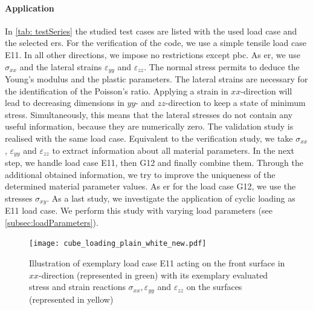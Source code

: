 \paragraph{Application}
In \autoref{tab: testSeries} the studied test cases are listed with the used load case and the selected \acrlong{er}s.
For the verification of the code, we use a simple tensile load case E11.
In all other directions, we impose no restrictions except \acrshort{pbc}. As \acrlong{er}, we use $\sigma_{xx}$ and the lateral strains $\varepsilon_{yy}$ and $\varepsilon_{zz}$. The normal stress permits to deduce the Young's modulus and the plastic parameters. The lateral strains are necessary for the identification of the Poisson's ratio. Applying a strain in $xx$-direction will lead to decreasing dimensions in $yy$- and $zz$-direction to keep a state of minimum stress. Simultaneously, this means that the lateral stresses do not contain any useful information, because they are numerically zero. 
The validation study is realised with the same load case. Equivalent to the verification study, we take $\sigma_{xx}$,  $\varepsilon_{yy}$ and $\varepsilon_{zz}$ to extract information about all material parameters. 
In the next step, we handle load case E11, then G12 and finally combine them. Through the additional obtained information, we try to improve the uniqueness of the determined material parameter values. As \acrlong{er} for the load case G12, we use the stresses $\sigma_{xy}$.
As a last study, we investigate the application of cyclic loading as E11 load case. We perform this study with varying load parameters (see \autoref{subsec:loadParameters}). 


\begin{figure}[H]
    \centering
    \texttt{[image: cube\_loading\_plain\_white\_new.pdf]}
    \caption{Illustration of exemplary load case E11 acting on the front surface in $xx$-direction (represented in green) with its exemplary evaluated stress and strain reactions $\sigma_{xx}, \varepsilon_{yy}$ and $\varepsilon_{zz}$ on the surfaces (represented in yellow)}
    \label{fig:evaluationMeasurements}
\end{figure}

